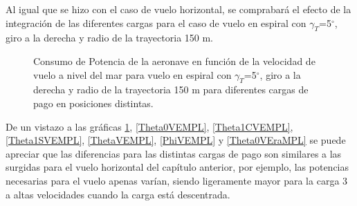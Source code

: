 Al igual que se hizo con el caso de vuelo horizontal, se comprabará el efecto de la integración de las diferentes cargas para el caso de vuelo en espiral con $\gamma_T$=5$^\circ$, giro a la derecha y radio de la trayectoria 150 m.

\begin{figure}
	\centering
	\caption{Consumo de Potencia de la aeronave en función de la velocidad de vuelo a nivel del mar para vuelo en espiral con $\gamma_T$=5$^\circ$, giro a la derecha y radio de la trayectoria 150 m para diferentes cargas de pago en posiciones distintas.}
	\label{PMVEMPL}
\end{figure}

De un vistazo a las gráficas \ref{PMVEMPL}, \ref{Theta0VEMPL}, \ref{Theta1CVEMPL}, \ref{Theta1SVEMPL}, \ref{ThetaVEMPL}, \ref{PhiVEMPL} y \ref{Theta0VEraMPL} se puede apreciar que las diferencias para las distintas cargas de pago son similares a las surgidas para el vuelo horizontal del capítulo anterior, por ejemplo, las potencias necesarias para el vuelo apenas varían, siendo ligeramente mayor para la carga 3 a altas velocidades cuando la carga está descentrada.

